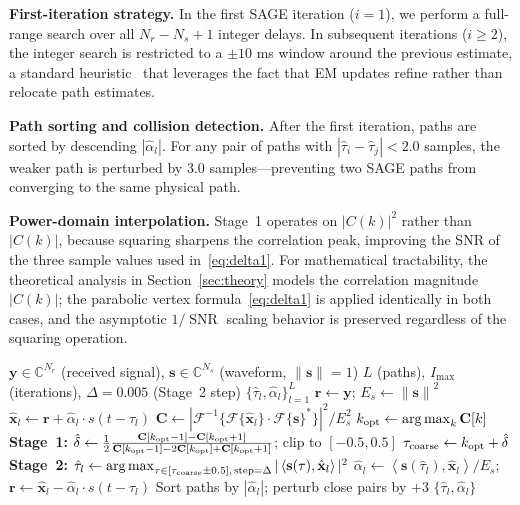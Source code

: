 \documentclass[a4paper,fleqn]{cas-dc}
\DeclareMathOperator*{\argmax}{arg\,max}
\DeclareMathOperator{\SNR}{SNR}
\newcommand{\Fc}{\mathcal{F}}
\newcommand{\Cc}{\mathbb{C}}
\newcommand{\norm}[1]{\left\lVert #1 \right\rVert}
\newcommand{\inner}[2]{\left\langle #1, #2 \right\rangle}
\newcommand{\hb}[1]{\hat{#1}}
\begin{document}
\textbf{First-iteration strategy.} In the first SAGE iteration ($i = 1$), we perform a full-range search over all $N_r - N_s + 1$ integer delays. In subsequent iterations ($i \ge 2$), the integer search is restricted to a $\pm 10$ ms window around the previous estimate, a standard heuristic~\cite{fleury1999} that leverages the fact that EM updates refine rather than relocate path estimates.

\textbf{Path sorting and collision detection.} After the first iteration, paths are sorted by descending $|\hb{\alpha}_l|$. For any pair of paths with $|\hb{\tau}_i - \hb{\tau}_j| < 2.0$ samples, the weaker path is perturbed by 3.0 samples---preventing two SAGE paths from converging to the same physical path.

\textbf{Power-domain interpolation.} Stage~1 operates on $|C(k)|^2$ rather than $|C(k)|$, because squaring sharpens the correlation peak, improving the SNR of the three sample values used in~\eqref{eq:delta1}. For mathematical tractability, the theoretical analysis in Section~\ref{sec:theory} models the correlation magnitude $|C(k)|$; the parabolic vertex formula~\eqref{eq:delta1} is applied identically in both cases, and the asymptotic $1/\SNR$ scaling behavior is preserved regardless of the squaring operation.

\begin{algorithm}[t]
\caption{Two-Stage CD-SAGE}
\label{alg:sage}
\begin{algorithmic}[1]
\Require $\mathbf{y} \in \Cc^{N_r}$ (received signal), $\mathbf{s} \in \Cc^{N_s}$ (waveform, $\norm{\mathbf{s}}=1$)
\Require $L$ (paths), $I_{\max}$ (iterations), $\Delta=0.005$ (Stage~2 step)
\Ensure $\{\hat{\tau}_l, \hat{\alpha}_l\}_{l=1}^{L}$
\State $\mathbf{r} \gets \mathbf{y}$; $E_s \gets \norm{\mathbf{s}}^2$
    \State $\hat{\mathbf{x}}_l \gets \mathbf{r} + \hat{\alpha}_l \cdot s(t-\hat{\tau}_l)$ 
    \State $\mathbf{C} \gets |\Fc^{-1}\{\Fc\{\hat{\mathbf{x}}_l\} \cdot \Fc\{\mathbf{s}\}^*\}|^2 / E_s^2$ 
    \State $k_{\rm opt} \gets \argmax_{k} \mathbf{C}[k]$ 
    \State \textbf{Stage~1:} $\hat{\delta} \gets \frac{1}{2}\frac{\mathbf{C}[k_{\rm opt}-1] - \mathbf{C}[k_{\rm opt}+1]}{\mathbf{C}[k_{\rm opt}-1] - 2\mathbf{C}[k_{\rm opt}] + \mathbf{C}[k_{\rm opt}+1]}$; clip to $[-0.5,0.5]$
    \State $\tau_{\rm coarse} \gets k_{\rm opt} + \hat{\delta}$
    \State \textbf{Stage~2:} $\hat{\tau}_l \gets \argmax_{\tau \in [\tau_{\rm coarse}\pm0.5],\, \text{step}=\Delta} |\inner{\mathbf{s}(\tau)}{\hat{\mathbf{x}}_l}|^2$
    \State $\hat{\alpha}_l \gets \inner{\mathbf{s}(\hat{\tau}_l)}{\hat{\mathbf{x}}_l} / E_s$; $\mathbf{r} \gets \hat{\mathbf{x}}_l - \hat{\alpha}_l \cdot s(t-\hat{\tau}_l)$
  \EndFor
   \State Sort paths by $|\hat{\alpha}_l|$; perturb close pairs by $+3$ \EndIf
\EndFor
\State \Return $\{\hat{\tau}_l, \hat{\alpha}_l\}$
\end{algorithmic}
\end{algorithm}
\end{document}
